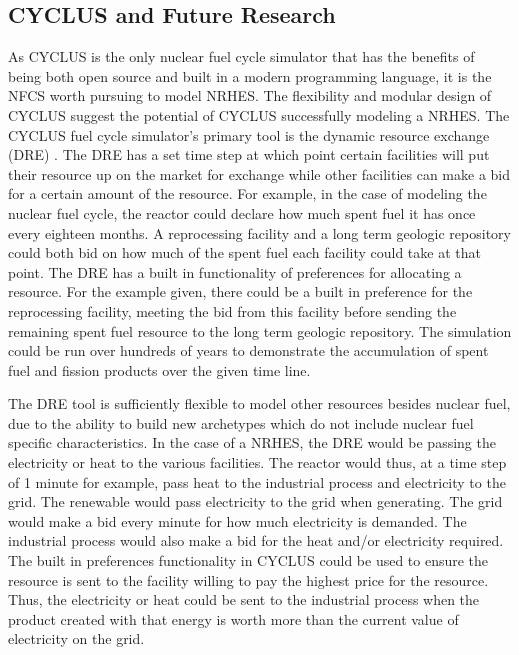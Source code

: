 \documentclass{article}                                                                           %
\begin{document}
\begin{linenumbers}
\section{CYCLUS and Future Research}

As CYCLUS is the only nuclear fuel cycle simulator that has the benefits of being both open source and built in a modern programming language, it is the NFCS worth pursuing to model NRHES. The flexibility and modular design of CYCLUS suggest the potential of CYCLUS successfully modeling a NRHES. The CYCLUS fuel cycle simulator's primary tool is the dynamic resource exchange (DRE) \cite{Huff2016}.  The DRE has a set time step at which point certain facilities will put their resource up on the market for exchange while other facilities can make a bid for a certain amount of the resource. For example, in the case of modeling the nuclear fuel cycle, the reactor could declare how much spent fuel it has once every eighteen months.  A reprocessing facility and a long term geologic repository could both bid on how much of the spent fuel each facility could take at that point.  The DRE has a built in functionality of preferences for allocating a resource.  For the example given, there could be a built in preference for the reprocessing facility, meeting the bid from this facility before sending the remaining spent fuel resource to the long term geologic repository. The simulation could be run over hundreds of years to demonstrate the accumulation of spent fuel and fission products over the given time line.

The DRE tool is sufficiently flexible to model other resources besides nuclear fuel, due to the ability to build new archetypes which do not include nuclear fuel specific characteristics.  In the case of a NRHES, the DRE would be passing the electricity or heat to the various facilities.  The reactor would thus, at a time step of 1 minute for example, pass heat to the industrial process and electricity to the grid.  The renewable would pass electricity to the grid when generating.  The grid would make a bid every minute for how much electricity is demanded.  The industrial process would also make a bid for the heat and/or electricity required.  The built in preferences functionality in CYCLUS could be used to ensure the resource is sent to the facility willing to pay the highest price for the resource.  Thus, the electricity or heat could be sent to the industrial process when the product created with that energy is worth more than the current value of electricity on the grid.
%
%


\end{linenumbers}
\end{document}

